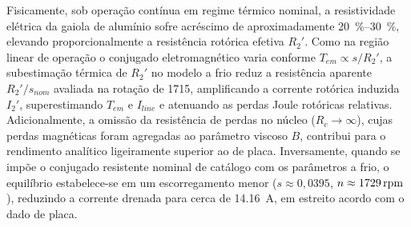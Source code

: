 Fisicamente, sob operação contínua em regime térmico nominal, a resistividade elétrica da gaiola de alumínio sofre acréscimo de aproximadamente \SIrange{20}{30}{\percent}, elevando proporcionalmente a resistência rotórica efetiva $R_2'$. Como na região linear de operação o conjugado eletromagnético varia conforme $T_{em} \propto s / R_2'$, a subestimação térmica de $R_2'$ no modelo a frio reduz a resistência aparente $R_2' / s_{nom}$ avaliada na rotação de \SI{1715}{\RPM}, amplificando a corrente rotórica induzida $I_2'$, superestimando $T_{em}$ e $I_{line}$ e atenuando as perdas Joule rotóricas relativas. Adicionalmente, a omissão da resistência de perdas no núcleo ($R_c \to \infty$), cujas perdas magnéticas foram agregadas ao parâmetro viscoso $B$, contribui para o rendimento analítico ligeiramente superior ao de placa. Inversamente, quando se impõe o conjugado resistente nominal de catálogo com os parâmetros a frio, o equilíbrio estabelece-se em um escorregamento menor ($s \approx 0{,}0395$, $n \approx \SI{1729}{\mathrm{rpm}}$), reduzindo a corrente drenada para cerca de \SI{14,16}{\ampere}, em estreito acordo com o dado de placa.